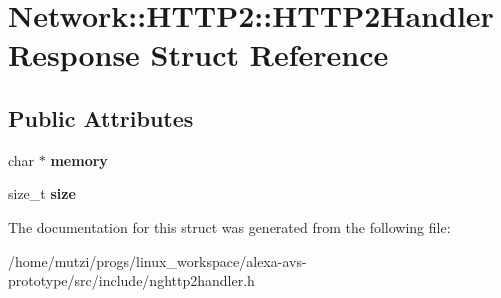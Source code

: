\hypertarget{structNetwork_1_1HTTP2_1_1HTTP2HandlerResponse}{}\section{Network\+:\+:H\+T\+T\+P2\+:\+:H\+T\+T\+P2\+Handler\+Response Struct Reference}
\label{structNetwork_1_1HTTP2_1_1HTTP2HandlerResponse}
\subsection*{Public Attributes}
\begin{DoxyCompactItemize}
\item 
\mbox{\label{structNetwork_1_1HTTP2_1_1HTTP2HandlerResponse_a0ff9bf4cac8ddee31482c3b0ce788d85}} 
char $\ast$ {\bfseries memory}
\item 
\mbox{\label{structNetwork_1_1HTTP2_1_1HTTP2HandlerResponse_a0a65650181e3502eec604fd7ec4f11f3}} 
size\+\_\+t {\bfseries size}
\end{DoxyCompactItemize}


The documentation for this struct was generated from the following file\+:\begin{DoxyCompactItemize}
\item 
/home/mutzi/progs/linux\+\_\+workspace/alexa-\/avs-\/prototype/src/include/nghttp2handler.\+h\end{DoxyCompactItemize}
